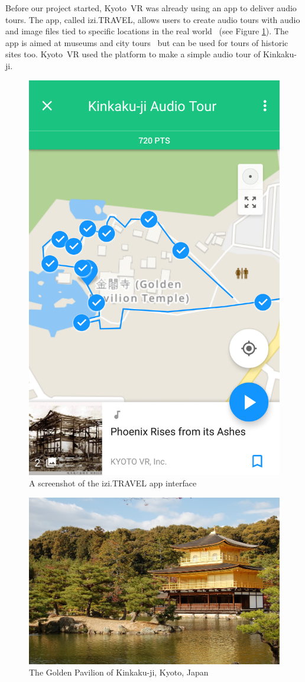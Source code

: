 \documentclass[a4paper, 10pt, american, titlepage]{article}
\begin{document}
Before our project started, Kyoto~VR was already using an app to deliver audio
tours. The app, called izi.TRAVEL, allows users to create audio tours with
audio and image files tied to specific locations in the real
world~\autocite{izitravel2015} (see Figure \ref{fig:iziTravel}). The app is
aimed at museums and city tours~\autocite{izitravel} but can be used for tours
of historic sites too. Kyoto~VR used the platform to make a simple audio tour
of Kinkaku-ji.

\begin{figure}[h]
	\centering
	\includegraphics[width=.5\textwidth]{izi-travel.png}
	\caption{A screenshot of the izi.TRAVEL app interface}
	\label{fig:iziTravel}
\end{figure}

\begin{figure}[h]
	\centering
	\includegraphics[width=\textwidth]{kinkakuji.jpg}
	\caption[The Golden Pavilion of Kinkaku-ji, Kyoto, Japan]{The Golden
		Pavilion of Kinkaku-ji, Kyoto, Japan~\autocite{davidson2005}}
	\label{fig:kinkakuji}
\end{figure}
\end{document}

